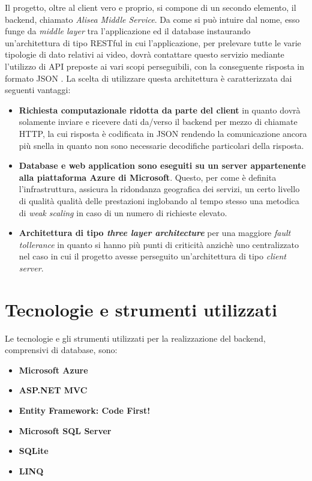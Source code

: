 \documentclass[a4]{book}
\begin{document}
Il progetto, oltre al client vero e proprio, si compone di un secondo elemento, il backend, chiamato \textit{Alisea Middle Service}. Da come si può intuire dal nome, esso funge da \textit{middle layer} tra l'applicazione ed il database instaurando un'architettura di tipo RESTful in cui l'applicazione, per prelevare tutte le varie tipologie di dato relativi ai video, dovrà contattare questo servizio mediante l'utilizzo di API preposte ai vari scopi perseguibili, con la conseguente risposta in formato JSON . La scelta di utilizzare questa architettura è caratterizzata dai seguenti vantaggi: \newline
\begin{itemize}
	\item \textbf{Richiesta computazionale ridotta da parte del client} in quanto dovrà solamente inviare e ricevere dati da/verso il backend per mezzo di chiamate HTTP, la cui risposta è codificata in JSON rendendo la comunicazione ancora più snella in quanto non sono necessarie decodifiche particolari della risposta.
	\item \textbf{Database e web application sono eseguiti su un server appartenente alla piattaforma Azure di Microsoft}. Questo, per come è definita l'infrastruttura, assicura la ridondanza geografica dei servizi, un certo livello di qualità qualità delle prestazioni inglobando al tempo stesso una metodica di \textit{weak scaling} in caso di un numero di richieste elevato.
	\item \textbf{Architettura di tipo \textit{three layer architecture}} per una maggiore \textit{fault tollerance} in quanto si hanno più punti di criticità anzichè uno centralizzato nel caso in cui il progetto avesse perseguito un'architettura di tipo \textit{client server}. \newline
\end{itemize}


\newpage
\section{Tecnologie e strumenti utilizzati}
Le tecnologie e gli strumenti utilizzati per la realizzazione del backend, comprensivi di database, sono:

\begin{itemize}
	\item \textbf{Microsoft Azure}
	\item \textbf{ASP.NET MVC}
	\item \textbf{Entity Framework: Code First!}
	\item \textbf{Microsoft SQL Server}
	\item \textbf{SQLite}
	\item \textbf{LINQ}	
\end{itemize}
\end{document}
